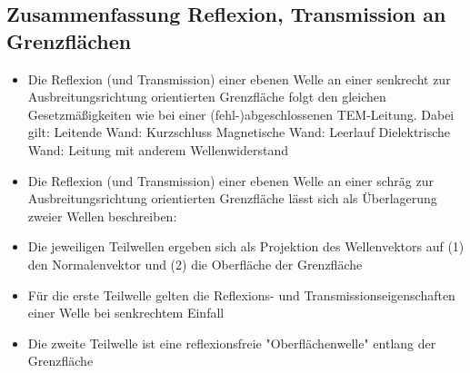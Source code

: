 \documentclass[english]{latex4ei/latex4ei_sheet}
\begin{document}
\begin{sectionbox}
	\subsection{Zusammenfassung Reflexion, Transmission an Grenzflächen}
	\begin{itemize}
		\item Die Reflexion (und Transmission) einer ebenen Welle an einer senkrecht zur Ausbreitungsrichtung orientierten Grenzfläche folgt den gleichen Gesetzmäßigkeiten wie bei einer (fehl-)abgeschlossenen TEM-Leitung. Dabei gilt:
		\subitem Leitende Wand: Kurzschluss
		\subitem Magnetische Wand: Leerlauf
		\subitem Dielektrische Wand: Leitung mit anderem Wellenwiderstand
		\item Die Reflexion (und Transmission) einer ebenen Welle an einer schräg zur Ausbreitungsrichtung orientierten Grenzfläche lässt sich als Überlagerung zweier Wellen beschreiben:
		\item Die jeweiligen Teilwellen ergeben sich als Projektion des Wellenvektors auf (1) den Normalenvektor und (2) die Oberfläche der Grenzfläche
		\item Für die erste Teilwelle gelten die Reflexions- und Transmissionseigenschaften einer Welle bei senkrechtem Einfall
		\item Die zweite Teilwelle ist eine reflexionsfreie "Oberflächenwelle" entlang der Grenzfläche
	\end{itemize}
\end{sectionbox}
\end{document}

